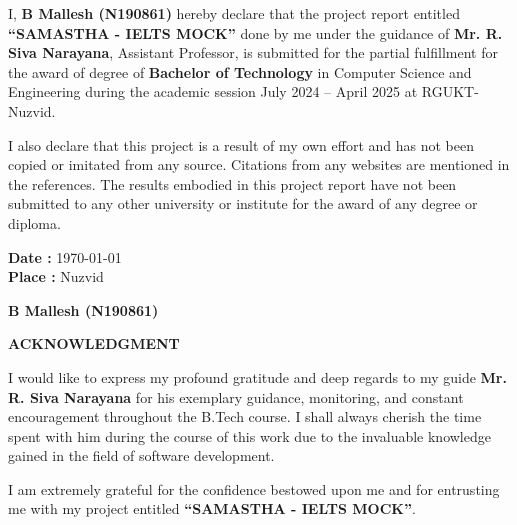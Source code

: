 \documentclass[a4paper,12pt]{article}
\begin{document}
\vspace{1cm}

\noindent
I, \textbf{B Mallesh (N190861)} hereby declare that the project report entitled \textbf{“SAMASTHA - IELTS MOCK”} done by me under the guidance of \textbf{Mr. R. Siva Narayana}, Assistant Professor, is submitted for the partial fulfillment for the award of degree of \textbf{Bachelor of Technology} in Computer Science and Engineering during the academic session July 2024 – April 2025 at RGUKT-Nuzvid.

\vspace{0.8cm}

\noindent
I also declare that this project is a result of my own effort and has not been copied or imitated from any source. Citations from any websites are mentioned in the references. The results embodied in this project report have not been submitted to any other university or institute for the award of any degree or diploma.

\vspace{6cm}


\begin{minipage}{0.45\textwidth}
\textbf{Date  :} \today\\
\textbf{Place :} Nuzvid
\end{minipage}
\hfill
\begin{minipage}{0.45\textwidth}
\raggedleft
\textbf{B Mallesh (N190861)}
\end{minipage}





\newpage
\begin{center}
\vspace*{1cm}
\textbf{\LARGE ACKNOWLEDGMENT}
\end{center}

\vspace{1cm}
\noindent
I would like to express my profound gratitude and deep regards to my guide \textbf{Mr. R. Siva Narayana} for his exemplary guidance, monitoring, and constant encouragement throughout the B.Tech course. I shall always cherish the time spent with him during the course of this work due to the invaluable knowledge gained in the field of software development.

\vspace{0.5cm}
\noindent
I am extremely grateful for the confidence bestowed upon me and for entrusting me with my project entitled \textbf{“SAMASTHA - IELTS MOCK”}.
\end{document}
